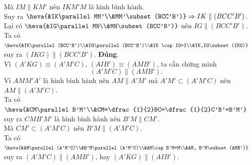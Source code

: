 \begin{ex}
{\begin{itemchoice}
			Mà  $IM\parallel KM'$ nên $IKM'M$ là hình bình hành.\\
			 Suy ra $\heva{&IK\parallel MM'\\&MM'\subset(BCC'B')} \Rightarrow IK\parallel(BCC'B')$.\\
			Lại có $\heva{&IG\parallel  MN\\&MN\subset(BCC'B')}$ nên $IG\parallel(BCC'B')$.\\
			Ta có $\heva{&IK\parallel(BCC'B')\\&IG\parallel(BCC'B')\\&IK \cap  IG=I\\&IK,IG\subset (IKG)}$ suy ra $(IKG)\parallel(BCC'B')$.
			\itemch \textbf{Đúng}.\\ 
			Vì $(A'KG)\equiv(A'M'C)$, $(AIB')\equiv(AMB')$,  ta cần chứng minh
			\[(A' M' C)\parallel  (AMB').\]
			Vì $AMM'A'$ là hình  bình hành nên $AM\parallel A'M'$ mà $A'M'\subset(A'M'C)$ nên $AM\parallel(A'M'C)$.\\
			Ta có $\heva{&CM\parallel  B'M'\\&CM=\dfrac{1}{2}BC=\dfrac{1}{2}C'B'=B'M'}$ suy ra $CMB'M'$ là hình bình hành nên $B'M\parallel CM'$.\\
			Mà $CM'\subset(A'M'C)$ nên  $ B'M\parallel(A'M'C)$.\\
			Ta có $\heva{&AM\parallel(A'M'C)\\&B'M\parallel(A'M'C)\\&AM\cap B'M=M\\&AM,  B'M\subset (AMB')}$ suy ra $(A'M'C)\parallel(AMB')$, hay $(A'KG)\parallel(AIB')$.
		\end{itemchoice}
	 }
\end{ex}

